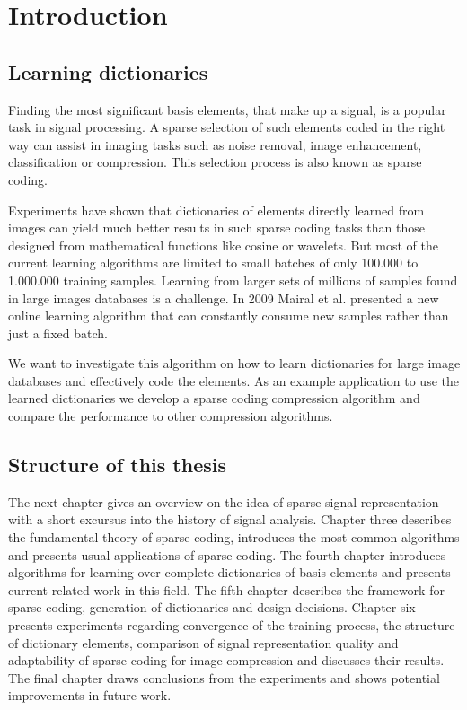 \chapter{Introduction}
\label{sec:introduction}
\section{Learning dictionaries}

Finding the most significant basis elements, that make up a
signal, is a popular task in signal processing. A sparse selection of such
elements coded in the right way can assist in imaging tasks such as noise
removal, image enhancement, classification or compression. This selection
process is also known as sparse coding.

Experiments \cite{Chen1998,Elad2006} have shown that dictionaries of 
elements directly learned from images can yield much better results in
such sparse coding tasks than those designed from mathematical functions like
cosine or wavelets. But most of the current learning algorithms are limited to
small batches of only 100.000 to 1.000.000 training samples. Learning from
larger sets of millions of samples found in large images databases is a
challenge. In 2009 Mairal et al.\cite{Mairal2009} presented a new online
learning algorithm that can constantly consume new samples rather than just a
fixed batch. 

We want to investigate this algorithm on how to learn dictionaries
for large image databases and effectively code the elements. As an example
application to use the learned dictionaries we develop a sparse coding
compression algorithm and compare the performance to other compression
algorithms.

\section{Structure of this thesis}
The next chapter gives an overview on the idea of sparse signal
representation with a short excursus into the history of signal analysis.
Chapter three describes the fundamental theory of sparse coding, introduces the
most common algorithms and presents usual applications of sparse coding. The
fourth chapter introduces algorithms for learning over-complete
dictionaries of basis elements and presents current related work in this field.
The fifth chapter describes the framework for sparse coding, generation
of dictionaries and design decisions. Chapter six presents experiments regarding
convergence of the training process, the structure of dictionary elements, 
comparison of signal representation quality and adaptability of sparse coding
for image compression and discusses their results. The final chapter draws
conclusions from the experiments and shows potential improvements in future
work. 


